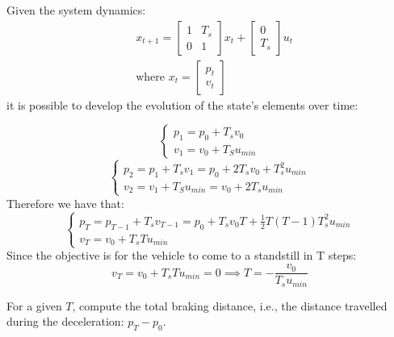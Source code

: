 \documentclass[]{article}
\begin{document}
\begin{flushleft}
Given the system dynamics:
\begin{equation}
	\begin{aligned}
		&x_{t+1} = \begin{bmatrix}
			1 & T_s \\ 
			0 & 1
		\end{bmatrix} x_t +
		\begin{bmatrix}
			0 \\ T_s
		\end{bmatrix} u_t \\
		&\text{where } x_t = \begin{bmatrix}
			p_t \\ 
			v_t
		\end{bmatrix}
	\end{aligned}
\end{equation}
it is possible to develop the evolution of the state's elements over time:
\end{flushleft}
\begin{equation}
	\begin{cases}
		p_1 = p_0 + T_s v_0 \\
		v_1 = v_0 + T_S u_{min}
	\end{cases}
\end{equation}
\begin{equation}
	\begin{cases}
		p_2 = p_1 + T_s v_1 = p_0 + 2 T_s v_0 + T_s^2 u_{min} \\
		v_2 = v_1 + T_S u_{min} = v_0 + 2 T_s u_{min}
	\end{cases}
\end{equation}
Therefore we have that:
\begin{equation}
	\begin{cases}
		p_T = p_{T-1} + T_s v_{T-1} = p_0 + T_s v_0 T + \frac{1}{2} T (T-1) T_s^2 u_{min} \\
		v_T = v_0 + T_s T u_{min}
	\end{cases}
\end{equation}
Since the objective is for the vehicle to come to a standstill in T steps:
\begin{equation}
	v_T = v_0 + T_s T u_{min} = 0 \implies T = -\frac{v_0}{T_s u_{min}}
\end{equation}



\begin{assignment}
	For a given $T$, compute the total braking distance, i.e., the distance travelled during the 
	deceleration: $p_T - p_0$. 
\end{assignment}
\end{document}
